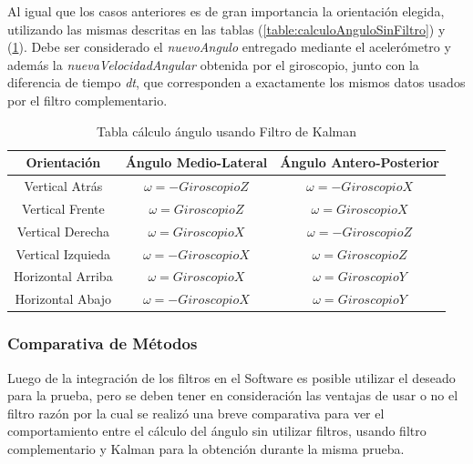\documentclass[12pt,a4paper]{article}
\begin{document}
Al igual que los casos anteriores es de gran importancia la orientación elegida, utilizando las mismas descritas en las tablas (\ref{table:calculoAnguloSinFiltro}) y (\ref{table:calculoAnguloFiltroKalman}).
Debe ser considerado el \textit{nuevoAngulo} entregado mediante el acelerómetro y además la \textit{nuevaVelocidadAngular} obtenida por el giroscopio, junto con la diferencia de tiempo \textit{dt}, que corresponden a exactamente los mismos datos usados por el filtro complementario.
\begin{table}[H]
	\centering
	\begin{tabular}{|c|c|c|}
		\hline 
		\textbf{Orientación} & \textbf{Ángulo Medio-Lateral} & \textbf{Ángulo Antero-Posterior} \\ 
		\hline 
		Vertical Atrás & $\omega= -GiroscopioZ$ &  $\omega= -GiroscopioX$ \\ 
		\hline 
		Vertical Frente & $\omega= GiroscopioZ$ &  $\omega= GiroscopioX$ \\
		\hline 
		Vertical Derecha & $\omega= GiroscopioX$ &  $\omega= -GiroscopioZ$ \\ 
		\hline 
		Vertical Izquieda & $\omega= -GiroscopioX$ &  $\omega= GiroscopioZ$ \\ 
		\hline 
		Horizontal Arriba & $\omega= GiroscopioX$ &  $\omega= GiroscopioY$ \\ 
		\hline 
		Horizontal Abajo & $\omega= -GiroscopioX$ &  $\omega= GiroscopioY$ \\ 
		\hline 
	\end{tabular}
	\caption{Tabla cálculo ángulo usando Filtro de Kalman} 
	\label{table:calculoAnguloFiltroKalman}
\end{table}

\subsubsection{Comparativa de Métodos}
Luego de la integración de los filtros en el Software es posible utilizar el deseado para la prueba, pero se deben tener en consideración las ventajas de usar o no el filtro razón por la cual se realizó una breve comparativa para ver el comportamiento entre el cálculo del ángulo sin utilizar filtros, usando filtro complementario y Kalman para la obtención durante la misma prueba.
\end{document}
